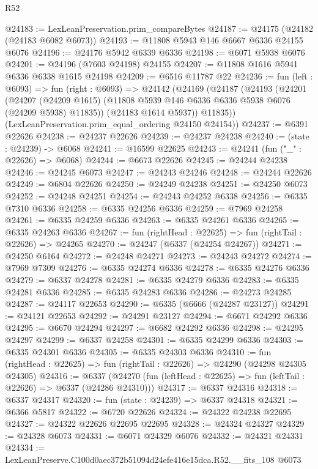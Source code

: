 \begin{lexlean}{R52}
\begin{coremodule}
@24183 := LexLeanPreservation.prim_compareBytes
@24187 := @24175 (@24182 (@24183 @6082 @6073))
@24193 := @11808 @5943 @146 @6667 @6336 @24155 @6076
@24196 := @24176 @5942 @6339 @6336
@24198 := @6071 @5938 @6076
@24201 := @24196 (@7603 @24198) @24155
@24207 := @11808 @1616 @5941 @6336 @6338 @1615 @24198
@24209 := @6516 @11787 @22
@24236 := fun (left : @6093) =>
  fun (right : @6093) =>
  @24142
    (@24169
      (@24187
        (@24193
          (@24201
            (@24207
              (@24209 @1615)
              (@11808 @5939 @146 @6336 @6336 @5938 @6076 (@24209 @5938) @11835))
            (@24183 @1614 @5937))
          @11835))
      (LexLeanPreservation.prim_equal_ordering @24150 @24154))
@24237 := @6391 @22626
@24238 := @24237 @22626
@24239 := @24237 @24238
@24240 := (state : @24239) -> @6068
@24241 := @16599 @22625
@24243 := @24241 (fun ("_" : @22626) => @6068)
@24244 := @6673 @22626
@24245 := @24244 @24238
@24246 := @24245 @6073
@24247 := @24243 @24246
@24248 := @24244 @22626
@24249 := @6804 @22626
@24250 := @24249 @24238
@24251 := @24250 @6073
@24252 := @24248 @24251
@24254 := @24243 @24252 @6338
@24256 := @6335 @7310 @6336
@24258 := @6335 @24256 @6336
@24259 := @7969 @24258
@24261 := @6335 @24259 @6336
@24263 := @6335 @24261 @6336
@24265 := @6335 @24263 @6336
@24267 := fun (rightHead : @22625) => fun (rightTail : @22626) => @24265
@24270 := @24247 (@6337 (@24254 @24267))
@24271 := @24250 @6164
@24272 := @24248 @24271
@24273 := @24243 @24272
@24274 := @7969 @7309
@24276 := @6335 @24274 @6336
@24278 := @6335 @24276 @6336
@24279 := @6337 @24278
@24281 := @6335 @24279 @6336
@24283 := @6335 @24281 @6336
@24285 := @6335 @24283 @6336
@24286 := @24273 @24285
@24287 := @24117 @22653
@24290 := @6335 (@6666 (@24287 @23127))
@24291 := @24121 @22653
@24292 := @24291 @23127
@24294 := @6671 @24292 @6336
@24295 := @6670 @24294
@24297 := @6682 @24292 @6336
@24298 := @24295 @24297
@24299 := @6337 @24258
@24301 := @6335 @24299 @6336
@24303 := @6335 @24301 @6336
@24305 := @6335 @24303 @6336
@24310 := fun (rightHead : @22625) => fun (rightTail : @22626) => @24290 (@24298 @24305 @24305)
@24316 := @6337
    (@24270 (fun (leftHead : @22625) => fun (leftTail : @22626) => @6337 (@24286 @24310)))
@24317 := @6337 @24316
@24318 := @6337 @24317
@24320 := fun (state : @24239) => @6337 @24318
@24321 := @6366 @5817
@24322 := @6720 @22626
@24324 := @24322 @24238 @22695
@24327 := @24322 @22626 @22695 @22695
@24328 := @24324 @24327
@24329 := @24328 @6073
@24331 := @6071 @24329 @6076
@24332 := @24321 @24331
@24334 := LexLeanPreserve.C100d0aec372b51094d24efe416e15dca.R52.__fits_108 @6073

\end{coremodule}
\end{lexlean}
